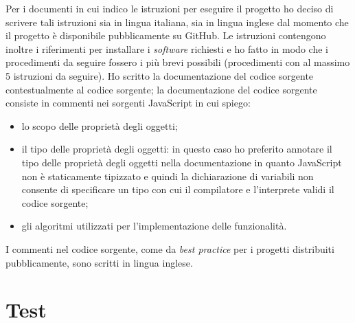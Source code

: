 Per i documenti in cui indico le istruzioni per eseguire il progetto ho deciso di scrivere tali istruzioni sia in lingua italiana, sia in lingua inglese dal momento che il progetto è disponibile pubblicamente su GitHub. Le istruzioni contengono inoltre i riferimenti per installare i \emph{software} richiesti e ho fatto in modo che i procedimenti da seguire fossero i più brevi possibili (procedimenti con al massimo 5 istruzioni da seguire).
Ho scritto la documentazione del codice sorgente contestualmente al codice sorgente; la documentazione del codice sorgente consiste in commenti nei sorgenti JavaScript in cui spiego:
\begin{itemize}
	\item lo scopo delle proprietà degli oggetti;
	\item il tipo delle proprietà degli oggetti: in questo caso ho preferito annotare il tipo delle proprietà degli oggetti nella documentazione in quanto JavaScript non è staticamente tipizzato e quindi la dichiarazione di variabili non consente di specificare un tipo con cui il compilatore e l'interprete validi il codice sorgente;
	\item gli algoritmi utilizzati per l'implementazione delle funzionalità.
\end{itemize}
I commenti nel codice sorgente, come da \emph{best practice} per i progetti distribuiti pubblicamente, sono scritti in lingua inglese.

\pagebreak

\section{Test}

